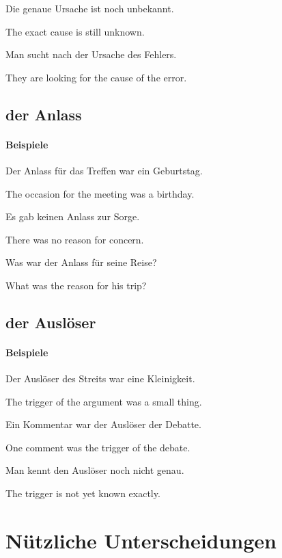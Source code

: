 \documentclass[a4paper]{article}
\newcommand{\EN}[1]{\par{\small\textcolor{TranslationGray}{#1}}\vspace{0.25em}}
\begin{document}
        Die genaue Ursache ist noch unbekannt.\\
        \EN{The exact cause is still unknown.}
        
        Man sucht nach der Ursache des Fehlers.\\
        \EN{They are looking for the cause of the error.}
    
    \subsection{der Anlass}
    
    \paragraph{Beispiele}
        Der Anlass für das Treffen war ein Geburtstag.\\
        \EN{The occasion for the meeting was a birthday.}
        
        Es gab keinen Anlass zur Sorge.\\
        \EN{There was no reason for concern.}
        
        Was war der Anlass für seine Reise?\\
        \EN{What was the reason for his trip?}
    
    \subsection{der Auslöser}
    
    \paragraph{Beispiele}
        Der Auslöser des Streits war eine Kleinigkeit.\\
        \EN{The trigger of the argument was a small thing.}
        
        Ein Kommentar war der Auslöser der Debatte.\\
        \EN{One comment was the trigger of the debate.}
        
        Man kennt den Auslöser noch nicht genau.\\
        \EN{The trigger is not yet known exactly.}
    
    
    \section{Nützliche Unterscheidungen}
    
\end{document}
